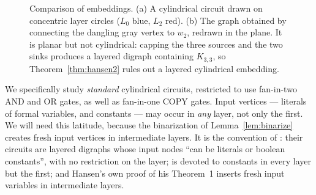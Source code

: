 \documentclass[11pt]{article}
\theoremstyle{definition}
\theoremstyle{remark}
\begin{document}
\begin{figure}[t]
\caption{Comparison of embeddings. (a) A cylindrical circuit drawn on concentric layer circles ($L_0$ blue, $L_2$ red). (b) The graph obtained by connecting the dangling gray vertex to $w_2$, redrawn in the plane. It is planar but not cylindrical: capping the three sources and the two sinks produces a layered digraph containing $K_{3,3}$, so Theorem~\ref{thm:hansen2} rules out a layered cylindrical embedding.}
\label{fig:cyl_examples}
\end{figure}

We specifically study \emph{standard} cylindrical circuits, restricted to use fan-in-two $\mathrm{AND}$ and $\mathrm{OR}$ gates, as well as fan-in-one $\mathrm{COPY}$ gates. Input vertices --- literals of formal variables, and constants --- may occur in \emph{any} layer, not only the first. We will need this latitude, because the binarization of Lemma~\ref{lem:binarize} creates fresh input vertices in intermediate layers. It is the convention of \cite{Hansen03,HMV02}: their circuits are layered digraphs whose input nodes ``can be literals or boolean constants'', with no restriction on the layer; \cite[Lemma~7]{HMV02} is devoted to constants in every layer but the first; and Hansen's own proof of his Theorem~1 inserts fresh input variables in intermediate layers.
\end{document}
